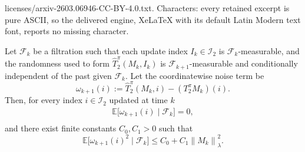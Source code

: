 \documentclass[10pt,a4paper]{amsart}
\newcommand{\E}{\mathbb{E}}
\newcommand{\LVert}{\left\lVert}
\newcommand{\RVert}{\right\rVert}
\begin{document}
licenses/arxiv-2603.06946-CC-BY-4.0.txt. Characters: every retained excerpt is pure ASCII, so the delivered engine, XeLaTeX with its default Latin Modern text font, reports no missing character.
\begin{lemma}\label{lem:noises}
Let $\mathcal{F}_k$ be a filtration such that each update index $I_k \in \mathcal{I}_2$ is $\mathcal{F}_k$-measurable, and the randomness used to form $\hat{T}^\pi_2(M_k, I_k)$ is $\mathcal{F}_{k+1}$-measurable and conditionally independent of the past given $\mathcal{F}_k$. Let the coordinatewise noise term be 
\begin{equation}
\omega_{k+1}(i) := \hat{T}^\pi_2(M_k, i) - (T^\pi_2M_k)(i).
\end{equation}
Then, for every index $i \in \mathcal{I}_2$ updated at time $k$
\begin{equation}\label{eq:noisemean}
\begin{gathered}
\E\big[\omega_{k+1}(i)\mid \mathcal{F}_k \big] = 0,\\
\end{gathered}
\end{equation}
and there exist finite constants $C_0, C_1>0$ such that
\begin{equation}\label{eq:noise2}
\E\big[\omega_{k+1}(i)^2\mid \mathcal{F}_k \big] \le C_0 + C_1 \LVert M_k \RVert_\lambda^2.
\end{equation}
\end{lemma}
\end{document}
